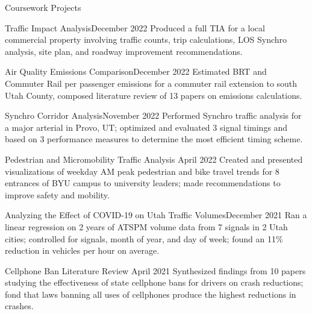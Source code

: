\documentclass{resume} %
\begin{document}
\begin{rSection}{Coursework Projects}
\begin{pSubsection}{Traffic Impact Analysis}{December 2022}
{Produced a full TIA for a local commercial property involving traffic counts, trip calculations, LOS Synchro analysis, site plan, and roadway improvement recommendations.}
\end{pSubsection}


\begin{pSubsection}{Air Quality Emissions Comparison}{December 2022}
{Estimated BRT and Commuter Rail per passenger emissions for a commuter rail extension to south Utah County, composed literature review of 13 papers on emissions calculations.}
\end{pSubsection}


\begin{pSubsection}{Synchro Corridor Analysis}{November 2022}
{Performed Synchro traffic analysis for a major arterial in Provo, UT; optimized and evaluated 3 signal timings and based on 3 performance measures to determine the most efficient timing scheme.}
\end{pSubsection}


\begin{pSubsection}{Pedestrian and Micromobility Traffic Analysis} {April 2022}
{Created and presented visualizations of weekday AM peak pedestrian and bike travel trends for 8 entrances of BYU campus to university leaders; made recommendations to improve safety and mobility.}
\end{pSubsection}


\begin{pSubsection}{Analyzing the Effect of COVID-19 on Utah Traffic Volumes}{December 2021}
{Ran a linear regression on 2 years of ATSPM volume data from 7 signals in 2 Utah cities; controlled for signals, month of year, and day of week; found an 11\% reduction in vehicles per hour on average.}
\end{pSubsection}


\begin{pSubsection}{Cellphone Ban Literature Review} {April 2021}
{Synthesized findings from 10 papers studying the effectiveness of state cellphone bans for drivers on crash reductions; fond that laws banning all uses of cellphones produce the highest reductions in crashes.}
\end{pSubsection}
\end{rSection}

\end{document}
